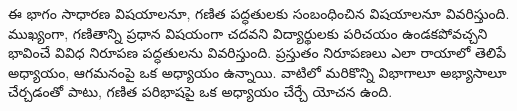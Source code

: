 \documentclass[../../include/open-logic-part]{subfiles}
\begin{document}

\begin{editorial}
  ఈ భాగం సాధారణ విషయాలనూ, గణిత పద్ధతులకు సంబంధించిన
  విషయాలనూ వివరిస్తుంది. ముఖ్యంగా, గణితాన్ని ప్రధాన విషయంగా
  చదవని విద్యార్థులకు పరిచయం ఉండకపోవచ్చని భావించే వివిధ
  నిరూపణ పద్ధతులను వివరిస్తుంది.
  ప్రస్తుతం నిరూపణలు ఎలా రాయాలో తెలిపే అధ్యాయం, ఆగమనంపై
  ఒక అధ్యాయం ఉన్నాయి. వాటిలో మరికొన్ని విభాగాలూ అభ్యాసాలూ
  చేర్చడంతో పాటు, గణిత పరిభాషపై ఒక అధ్యాయం చేర్చే యోచన ఉంది.
\end{editorial}



\OLEndPartHook
\end{document}
